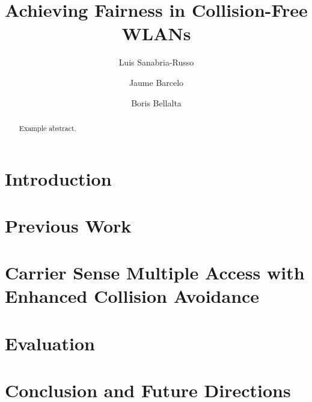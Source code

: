 \documentclass[]{llncs}
\begin{document}
\title{Achieving Fairness in Collision-Free WLANs}
\author{Luis Sanabria-Russo \and Jaume Barcelo \and Boris Bellalta}
\maketitle

\begin{abstract}
Example abstract.
\end{abstract}

\section{Introduction}\label{introduction}
	
\section{Previous Work}\label{previousWork}
	
\section{Carrier Sense Multiple Access with Enhanced Collision Avoidance}\label{ECA}
	
\section{Evaluation}\label{evaluation}
	
\section{Conclusion and Future Directions}\label{conclusion}
	
\end{document}
